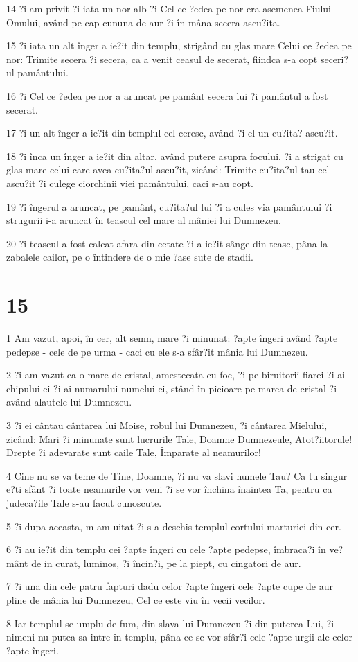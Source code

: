 \par 14 ?i am privit ?i iata un nor alb ?i Cel ce ?edea pe nor era asemenea Fiului Omului, având pe cap cununa de aur ?i în mâna secera ascu?ita.
\par 15 ?i iata un alt înger a ie?it din templu, strigând cu glas mare Celui ce ?edea pe nor: Trimite secera ?i secera, ca a venit ceasul de secerat, fiindca s-a copt seceri?ul pamântului.
\par 16 ?i Cel ce ?edea pe nor a aruncat pe pamânt secera lui ?i pamântul a fost secerat.
\par 17 ?i un alt înger a ie?it din templul cel ceresc, având ?i el un cu?ita? ascu?it.
\par 18 ?i înca un înger a ie?it din altar, având putere asupra focului, ?i a strigat cu glas mare celui care avea cu?ita?ul ascu?it, zicând: Trimite cu?ita?ul tau cel ascu?it ?i culege ciorchinii viei pamântului, caci s-au copt.
\par 19 ?i îngerul a aruncat, pe pamânt, cu?ita?ul lui ?i a cules via pamântului ?i strugurii i-a aruncat în teascul cel mare al mâniei lui Dumnezeu.
\par 20 ?i teascul a fost calcat afara din cetate ?i a ie?it sânge din teasc, pâna la zabalele cailor, pe o întindere de o mie ?ase sute de stadii.

\chapter{15}

\par 1 Am vazut, apoi, în cer, alt semn, mare ?i minunat: ?apte îngeri având ?apte pedepse - cele de pe urma - caci cu ele s-a sfâr?it mânia lui Dumnezeu.
\par 2 ?i am vazut ca o mare de cristal, amestecata cu foc, ?i pe biruitorii fiarei ?i ai chipului ei ?i ai numarului numelui ei, stând în picioare pe marea de cristal ?i având alautele lui Dumnezeu.
\par 3 ?i ei cântau cântarea lui Moise, robul lui Dumnezeu, ?i cântarea Mielului, zicând: Mari ?i minunate sunt lucrurile Tale, Doamne Dumnezeule, Atot?iitorule! Drepte ?i adevarate sunt caile Tale, Împarate al neamurilor!
\par 4 Cine nu se va teme de Tine, Doamne, ?i nu va slavi numele Tau? Ca tu singur e?ti sfânt ?i toate neamurile vor veni ?i se vor închina înaintea Ta, pentru ca judeca?ile Tale s-au facut cunoscute.
\par 5 ?i dupa aceasta, m-am uitat ?i s-a deschis templul cortului marturiei din cer.
\par 6 ?i au ie?it din templu cei ?apte îngeri cu cele ?apte pedepse, îmbraca?i în ve?mânt de in curat, luminos, ?i încin?i, pe la piept, cu cingatori de aur.
\par 7 ?i una din cele patru fapturi dadu celor ?apte îngeri cele ?apte cupe de aur pline de mânia lui Dumnezeu, Cel ce este viu în vecii vecilor.
\par 8 Iar templul se umplu de fum, din slava lui Dumnezeu ?i din puterea Lui, ?i nimeni nu putea sa intre în templu, pâna ce se vor sfâr?i cele ?apte urgii ale celor ?apte îngeri.

